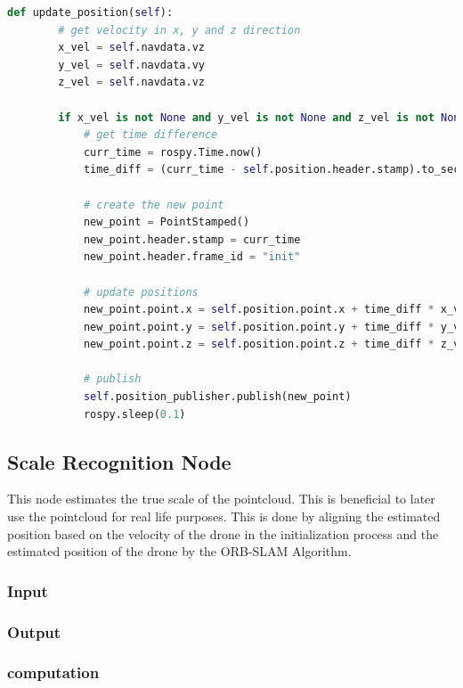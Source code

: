 	\begin{lstlisting}[language=python, caption=Main part of the position estimation node, label=lst:posupdate]
	def update_position(self):
        # get velocity in x, y and z direction
        x_vel = self.navdata.vz
        y_vel = self.navdata.vy
        z_vel = self.navdata.vz

        if x_vel is not None and y_vel is not None and z_vel is not None:
			# get time difference
            curr_time = rospy.Time.now()
            time_diff = (curr_time - self.position.header.stamp).to_sec()
			
			# create the new point
            new_point = PointStamped()
            new_point.header.stamp = curr_time
            new_point.header.frame_id = "init"
			
			# update positions
            new_point.point.x = self.position.point.x + time_diff * x_vel / 1000
            new_point.point.y = self.position.point.y + time_diff * y_vel / 1000
            new_point.point.z = self.position.point.z + time_diff * z_vel / 1000
			
			# publish
            self.position_publisher.publish(new_point)
            rospy.sleep(0.1)
	\end{lstlisting}
	
	\subsection{Scale Recognition Node}
	
	This node estimates the true scale of the pointcloud. This is beneficial to later use the pointcloud for real life purposes. 
	This is done by aligning the estimated position based on the velocity of the drone in the initialization process and the 
	estimated position of the drone by the ORB-SLAM Algorithm. 
	
	\subsubsection{Input}
	\subsubsection{Output}
	\subsubsection{computation}
	
